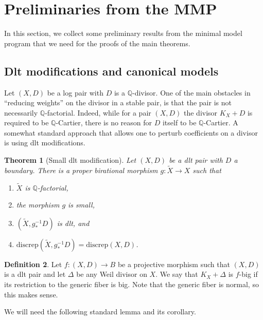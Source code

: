 \documentclass[11pt]{amsart}
\newtheorem{theorem}{Theorem}[section]
\theoremstyle{definition}
\newtheorem{definition}[theorem]{Definition}
\theoremstyle{remark}
\newcommand{\Q}{{\mathbb Q}}
\newcommand{\bQ}{{\mathbb Q}}
\newcommand{\tildeX}{\widetilde{X}}
\begin{document}
	
	
	
	\section{Preliminaries from the MMP} 
	
	In this section, we collect some preliminary results from the minimal model program that we need for the proofs of the main theorems. 
	
	\subsection{Dlt modifications and canonical models} Let $(X,D)$ be a log pair with $D$ is a $\mathbb{Q}$-divisor. One of the main obstacles in ``reducing weights'' on the divisor in a stable pair, is that the pair is not necessarily $\Q$-factorial. Indeed, while for a pair $(X,D)$ the divisor $K_X + D$ is required to be $\bQ$-Cartier, there is no reason for $D$ itself to be $\bQ$-Cartier. A somewhat standard approach that allows one to perturb coefficients on a divisor is using dlt modifications.
	
	
	\begin{theorem}[Small dlt modification]\cite[Corollary 1.37]{Kollarsingmmp}\label{dltmod}
		Let $(X,D)$ be a dlt pair with $D$ a boundary. There is a proper birational morphism $g: \tildeX \to X$ such that
		\begin{enumerate}
			\item $\tildeX$ is $\bQ$-factorial,
			\item the morphism $g$ is small, 
			\item $\left(\tildeX, g^{-1}_*D\right)$ is dlt, and
			\item $\mathrm{discrep}\left(\tildeX, g^{-1}_*D\right) = \mathrm{discrep}(X, D)$.
		\end{enumerate}
	\end{theorem}
	
	
	\begin{definition}\label{def:bigondlt} Let $f : (X,D) \to B$ be a projective morphism such that $(X,D)$ is a dlt pair and let $\Delta$ be any Weil divisor on $X$. We say that $K_X + \Delta$ is $f$-big if its restriction to the generic fiber is big. Note that the generic fiber is normal, so this makes sense.
	\end{definition} 
	
	We will need the following standard lemma and its corollary.
	
\end{document}
